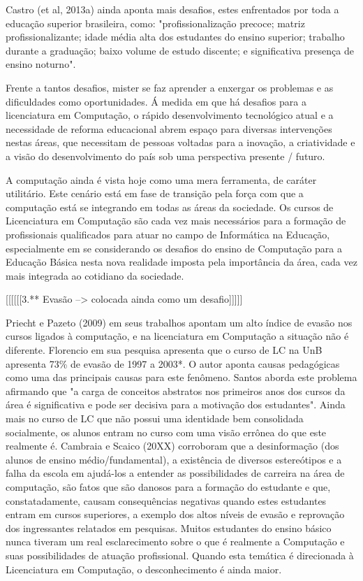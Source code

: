     Castro (et al, 2013a) ainda aponta mais desafios, estes enfrentados por toda a educação superior brasileira, como: "profissionalização precoce; matriz profissionalizante; idade média alta dos estudantes do ensino superior; trabalho durante a graduação; baixo volume de estudo discente; e significativa presença de ensino noturno".
	
    
    Frente a tantos desafios, mister se faz aprender a enxergar os problemas e as dificuldades como oportunidades. Á medida em que há desafios para a licenciatura em Computação, o rápido desenvolvimento tecnológico atual e a necessidade de reforma educacional abrem espaço para diversas intervenções nestas áreas, que necessitam de pessoas voltadas para a inovação, a criatividade e a visão do desenvolvimento do país sob uma perspectiva presente / futuro.
	
    
    A computação ainda é vista hoje como uma mera ferramenta, de caráter utilitário. Este cenário está em fase de transição pela força com que a computação está se integrando em todas as áreas da sociedade. Os cursos de Licenciatura em Computação são cada vez mais necessários para a
formação de profissionais qualificados para atuar no campo de Informática na Educação, especialmente em se considerando os desafios do ensino de Computação para a Educação Básica nesta nova realidade imposta pela importância da área, cada vez mais integrada ao cotidiano da sociedade. 

[[[[[[3.** Evasão --> colocada ainda como um desafio]]]]]
 
	Priecht e Pazeto (2009) em seus trabalhos apontam um alto índice de evasão nos cursos ligados à computação, e na licenciatura em Computação a situação não é diferente. Florencio em sua pesquisa apresenta que o curso de LC na UnB apresenta 73\% de evasão de 1997 a 2003*. O autor aponta causas pedagógicas como uma das principais causas para este fenômeno. Santos aborda este problema afirmando que "a carga de conceitos abstratos nos primeiros anos dos cursos da área é significativa e pode ser decisiva para a motivação dos estudantes". Ainda mais no curso de LC que não possui uma identidade bem consolidada socialmente, os alunos entram no curso com uma visão errônea do que este realmente é.
	Cambraia e Scaico (20XX) corroboram que a desinformação (dos alunos de ensino médio/fundamental), a existência de diversos estereótipos e a falha da escola em ajudá-los a entender as possibilidades de carreira na área de computação, são fatos que são danosos para a formação do estudante e que, constatadamente, causam consequências negativas quando estes estudantes entram em cursos superiores, a exemplo dos altos níveis de evasão e reprovação dos ingressantes relatados em pesquisas. Muitos estudantes do ensino básico nunca tiveram um real esclarecimento sobre o que é realmente a Computação e suas possibilidades de atuação profissional. Quando esta temática é direcionada à Licenciatura em Computação, o desconhecimento é ainda maior.
 
